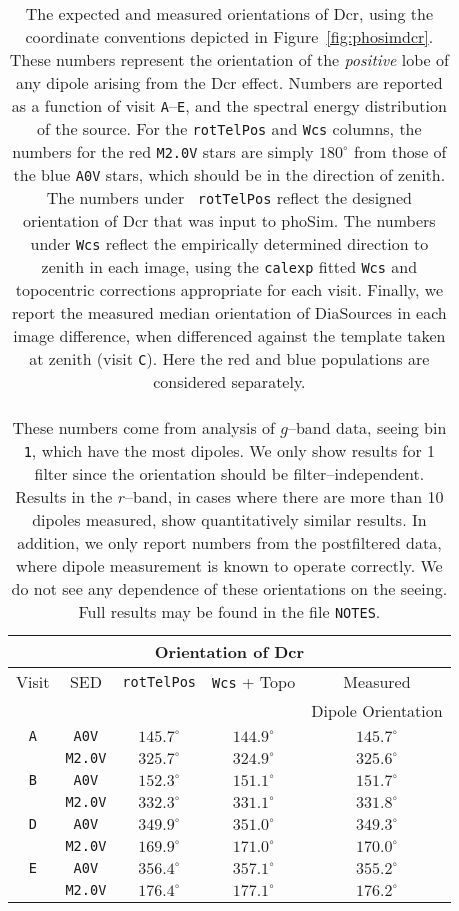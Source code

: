 \documentclass[prd, nofootinbib, floatfix, 11pt, tightenlines, times]{article}
\def\A{{\tt A}}
\def\B{{\tt B}}
\def\C{{\tt C}}
\def\D{{\tt D}}
\def\E{{\tt E}}
\begin{document}
\begin{table}
\centering
\begin{tabular}{ccccc}
\hline
\multicolumn{5}{|c|}{Orientation of Dcr} \\
\hline
Visit    & SED & {\tt rotTelPos} & {\tt Wcs} + Topo & Measured \\
         &     &                 &                  & Dipole Orientation \\
\hline
\A & {\tt A0V}   & $145.7^{\circ}$ & $144.9^{\circ}$ & $145.7^{\circ}$    \\
   & {\tt M2.0V} & $325.7^{\circ}$ & $324.9^{\circ}$ & $325.6^{\circ}$    \\
\hline
\B & {\tt A0V}   & $152.3^{\circ}$ & $151.1^{\circ}$ & $151.7^{\circ}$    \\
   & {\tt M2.0V} & $332.3^{\circ}$ & $331.1^{\circ}$ & $331.8^{\circ}$    \\
\hline
\D & {\tt A0V}   & $349.9^{\circ}$ & $351.0^{\circ}$ & $349.3^{\circ}$    \\
   & {\tt M2.0V} & $169.9^{\circ}$ & $171.0^{\circ}$ & $170.0^{\circ}$    \\
\hline
\E & {\tt A0V}   & $356.4^{\circ}$ & $357.1^{\circ}$ & $355.2^{\circ}$    \\
   & {\tt M2.0V} & $176.4^{\circ}$ & $177.1^{\circ}$ & $176.2^{\circ}$    \\
\end{tabular}
\caption[So I can have 2 paragraphs]{The expected and measured
  orientations of Dcr, using the coordinate conventions depicted in
  Figure~\ref{fig:phosimdcr}.  These numbers represent the orientation
  of the {\it positive} lobe of any dipole arising from the Dcr
  effect.  Numbers are reported as a function of visit \A--\E, and the
  spectral energy distribution of the source.  For the {\tt rotTelPos}
  and {\tt Wcs} columns, the numbers for the red {\tt M2.0V} stars are
  simply $180^{\circ}$ from those of the blue {\tt A0V} stars, which
  should be in the direction of zenith.  The numbers under {\tt
    rotTelPos} reflect the designed orientation of Dcr that was input
  to phoSim.  The numbers under {\tt Wcs} reflect the empirically
  determined direction to zenith in each image, using the {\tt calexp}
  fitted {\tt Wcs} and topocentric corrections appropriate for each
  visit.  Finally, we report the measured median orientation of
  DiaSources in each image difference, when differenced against the
  template taken at zenith (visit \C).  Here the red and blue
  populations are considered separately.  \\ ~ \\ These numbers come
  from analysis of $g$--band data, seeing bin {\tt 1}, which have the
  most dipoles.  We only show results for 1 filter since the
  orientation should be filter--independent.  Results in the
  $r$--band, in cases where there are more than 10 dipoles measured,
  show quantitatively similar results.  In addition, we only report
  numbers from the postfiltered data, where dipole measurement is
  known to operate correctly.  We do not see any dependence of these
  orientations on the seeing.  Full results may be found in the file
  {\tt NOTES}.}
\label{tab:dcrang}
\end{table}
\end{document}

